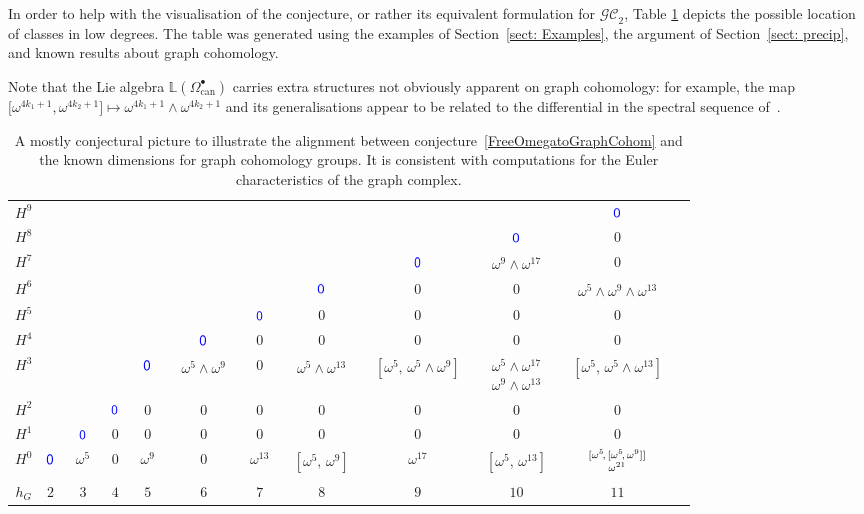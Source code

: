 \documentclass[pdftex]{sigma}%
\numberwithin{equation}{section}
\newcommand{\GC}{\mathcal{GC}}
\newcommand{\can}{\mathrm{can}}
\newcommand{\0}{\color{blue}{\mathsf{0}}}
\begin{document}
In order to help with the visualisation of the conjecture, or rather its equivalent formulation for $\GC_2$, Table \ref{tableForms} depicts the possible location of classes in low degrees. The table was generated using the examples of Section~\ref{sect: Examples}, the argument of Section~\ref{sect: precip}, and known results about graph cohomology.

Note that the Lie algebra $\mathbb{L}(\Omega^\bullet_{\can})$ carries extra structures not obviously apparent on graph cohomology: for example, the map $\big[\omega^{4k_1+1}, \omega^{4k_2+1}\big] \mapsto \omega^{4k_1+1} \wedge \omega^{4k_2+1}$ and its generalisations appear to be related to the differential in the spectral sequence of~\cite{SpectralSequenceGC2}.

\begin{table}[htp]
\caption{A mostly conjectural picture to illustrate the alignment between conjecture~\eqref{FreeOmegatoGraphCohom} and the known dimensions for graph cohomology groups. It is consistent with computations \cite{WZEulerCharacteristic} for the Euler characteristics of the graph complex.
}
\label{tableForms}
\begin{center}\renewcommand{\arraystretch}{1.1}
\begin{tabular}{c|ccccccccccc}
$H^9$ &&&&&&&&& & $\0$ \\
$H^8$ &&&&&&&&& $\0$ & 0 \\
$H^7$ &&&&&&&& $\0$& $\substack{\omega^9\wedge \omega^{17}}$ & 0 \\
$H^6$ &&&&&&& $\0$ & 0& 0 & $\substack{\omega^5\wedge \omega^{9} \wedge \omega^{13}}$ \\
$H^5$ &&&&&& $\0$ & 0 & 0& 0 & 0 \\
$H^4$ &&&&& $\0$ & 0 & 0& 0 &0 & 0\\
$H^3$ &&&& $\0$ & $ \substack{\omega^5\wedge\omega^{9}}$ & 0& $ \substack{\omega^5\wedge\omega^{13}}$ & $\substack{[\omega^5\!, \, \omega^5\wedge \omega^9]} $ & $ \substack{ \omega^5 \wedge \omega^{17} \\ \omega^9 \wedge \omega^{13}} $ & $\substack{[\omega^5 \! ,\, \omega^5 \wedge \omega^{13}] \\ [ \omega^9\!, \, \omega^5 \wedge \omega^9]}$ \\
$H^2$ &&& $\0$ & 0&0 & 0 & 0 & 0 & 0& 0 \\
$H^1$ && $\0$ & 0 & 0 & 0 & 0 & 0 & 0 & 0 & 0 \\
$H^0$ & $\0$ & $\,\,\, \omega^5 \,\,\, $ & 0& $\,\,\, \omega^9 \,\,\, $ &0 & $\,\, \omega^{13} \,\, $ & $\substack{[\omega^5\!, \, \omega^9]}$ & $\omega^{17}$ & $\substack{[\omega^{5}\!, \,\omega^{13}]}$ & $\substack{[\omega^5 \!,\, [ \omega^5\! ,\, \omega^{9}]] \\ \omega^{21} \vspace{.5ex}}$ \\
\hline
$h_G$ & $2$ & $3$ & $4$ & $5$ & $6$ & $7$ & $8$& $9$& $10$& $11$
\end{tabular}
\end{center}
\end{table}
\end{document}
